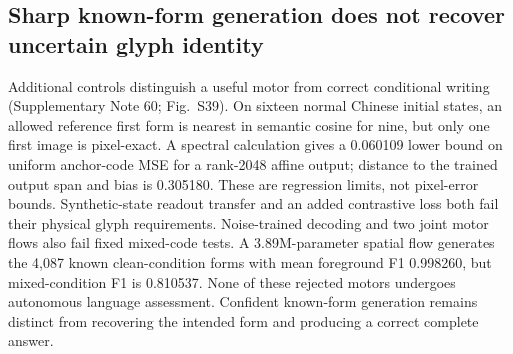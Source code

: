 \subsection*{Sharp known-form generation does not recover uncertain glyph identity}
Additional controls distinguish a useful motor from correct conditional
writing (Supplementary Note 60; Fig.~S39). On sixteen
normal Chinese initial states, an allowed reference first form is nearest
in semantic cosine for nine, but only one first image is pixel-exact.
A spectral calculation gives a 0.060109 lower bound on uniform anchor-code
MSE for a rank-2048 affine output; distance to the trained output span and
bias is 0.305180. These are regression limits, not pixel-error bounds.
Synthetic-state readout transfer and an added contrastive loss both fail
their physical glyph requirements. Noise-trained decoding and two joint
motor flows also fail fixed mixed-code tests. A 3.89M-parameter spatial
flow generates the 4,087 known clean-condition forms with mean foreground
F1 0.998260, but mixed-condition F1 is 0.810537. None of these rejected
motors undergoes autonomous language assessment. Confident known-form
generation remains distinct from recovering the intended form and producing
a correct complete answer.

